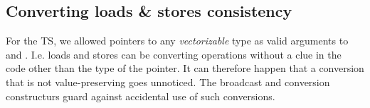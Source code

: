 %
%
%
\subsection{Converting loads \& stores consistency}\label{sec:convertingLoadsAndStores}

For the TS, we allowed pointers to any \emph{vectorizable} type as valid
arguments to  and .
I.e. loads and stores can be converting operations without a clue in the code
other than the type of the pointer.
It can therefore happen that a conversion that is not value-preserving goes
unnoticed.
The broadcast and  conversion constructurs guard against accidental
use of such conversions.

